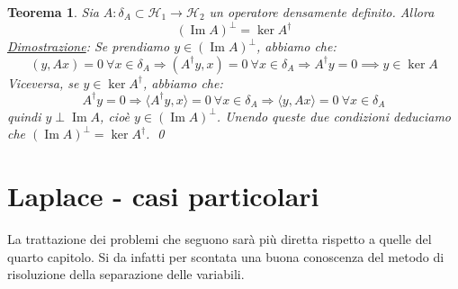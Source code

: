 \documentclass[a4paper,12pt]{report}
\newtheorem{teorema}{Teorema}[chapter]
\begin{document}
\newpage

\begin{teorema}\label{app: A.9}
Sia $A : \delta_A\subset \mathscr H_1 \to \mathscr H_2$ un operatore densamente definito. Allora
\[(\operatorname{Im}A)^\perp=\ker A^\dagger\]
\underline{Dimostrazione}: Se prendiamo $y\in (\operatorname{Im}A)^\perp$, abbiamo che:
\[( y,Ax) =0 \ \forall x\in \delta_A
\Longrightarrow
(A^\dagger y,x) =0 \ \forall x\in \delta_A
\Longrightarrow
A^\dagger y=0\implies y\in \ker A\]
Viceversa, se $y\in \ker A^\dagger$, abbiamo che: 
\[A^\dagger y=0
\Longrightarrow
\langle A^\dagger y,x\rangle =0 \ \forall x\in \delta_A
\Longrightarrow
\langle y,Ax\rangle =0 \ \forall x\in \delta_A\]
quindi $y\perp \operatorname{Im}A$, cioè $y\in (\operatorname{Im}A)^\perp$. Unendo queste due condizioni deduciamo che $(\operatorname{Im}A)^\perp=\ker A^\dagger$. \qed
\end{teorema}















































{\titlespacing*{\chapter}{0pt}{-0.2cm}{1cm}
\chapter{Laplace - casi particolari}}\label{app: cap 2}
\fancyhead[RO]{\nouppercase{\leftmark\ -- \rightmark}}


La trattazione dei problemi che seguono sarà più diretta rispetto a quelle del quarto capitolo. Si da infatti per scontata una buona conoscenza del metodo di risoluzione della separazione delle variabili.
\end{document}
